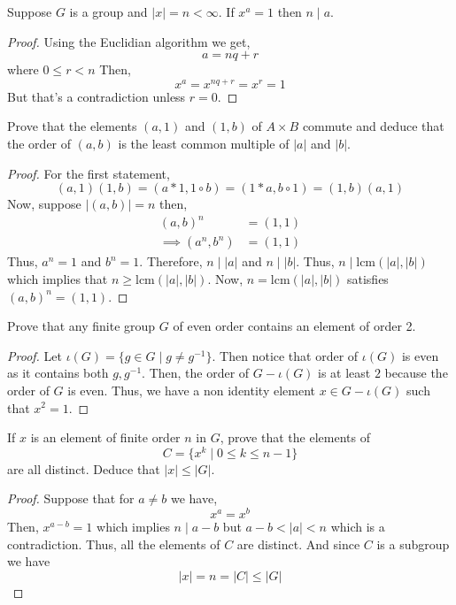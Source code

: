 \begin{problem}
    Suppose $G$ is a group and $|x|=n < \infty$. If $x^a = 1$ then $n \mid a$. 
\end{problem}

\begin{proof}
    Using the Euclidian algorithm we get,
    \[ a=nq+r \]
    where $0 \le r < n$
    Then,
    \[ x^a = x^{nq+r} = x^{r} = 1 \]
    But that's a contradiction unless $r=0$. 
\end{proof}

\begin{problem}
    Prove that the elements $(a, 1)$ and $(1, b)$ of $A \times B$ commute and deduce that the order of $(a, b)$ is the least common 
    multiple of $|a|$ and $|b|$.
\end{problem}

\begin{proof}
    For the first statement, 
    \[ (a,1)(1,b) = (a*1,1 \circ b) = (1*a,b \circ 1) = (1,b)(a,1) \]
    Now, suppose $|(a,b)|=n$ then,
    \begin{align*}
        (a,b)^n &= (1,1) \\
        \implies (a^n,b^n) &= (1,1)
    \end{align*}
    Thus, $a^n=1$ and $b^n=1$. Therefore, $n \mid |a|$ and $n \mid |b|$. Thus, $n \mid \text{lcm}(|a|,|b|)$ which implies that
    $n \ge \text{lcm}(|a|,|b|)$. Now, $n=\text{lcm}(|a|,|b|)$ satisfies $(a,b)^n=(1,1)$. 
\end{proof}

\begin{problem}
    Prove that any finite group $G$ of even order contains an element of order 2.
\end{problem}

\begin{proof}
    Let $\iota(G)=\{g \in G \mid g \neq g^{-1}\}$. Then notice that order of $\iota(G)$ is even as it contains both $g,g^{-1}$.
    Then, the order of $G-\iota(G)$ is at least $2$ because the order of $G$ is even. Thus, we have a non identity element 
    $x \in G - \iota(G)$ such that $x^2=1$.  
\end{proof}

\begin{problem}
    If $x$ is an element of finite order $n$ in $G$, prove that the elements of
    \[ C=\{x^k \mid 0 \le k \le n-1\} \]
    are all distinct.
    Deduce that $|x| \le |G|$.
\end{problem}

\begin{proof}
    Suppose that for $a \neq b$ we have,
    \[ x^a = x^b \]
    Then, $x^{a-b}=1$ which implies $n \mid a-b$ but $a-b < |a| < n$ which is a contradiction. Thus, all the elements of $C$ are distinct.
    And since $C$ is a subgroup we have 
    \[ |x|=n=|C| \le |G| \]
\end{proof}

